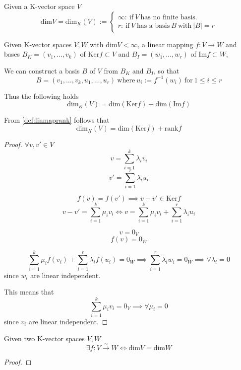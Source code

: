 \begin{definition}[Dimension]
   Given a K-vector space \(V\)
   \[\text{dim}V = \text{dim}_{K}(V) := \begin{cases}\infty:~\text{if}~V~\text{has no finite basis.}\\r:~\text{if}~V~\text{has a basis}~B~\text{with}~|B| = r\end{cases}\]
\end{definition}

\begin{theorem}\label{thm:dim_ker_im}
   Given K-vector spaces  \(V, W\) with \(\text{dim}V < \infty\), a linear mapping \(f: V \to W\) and bases \(B_{K} = (v_1, \ldots, v_k)\) of \(\text{Ker}f \subset V\) and \(B_{I} = (w_1, \ldots, w_r)\) of \(\text{Im}f \subset W\),

   We can construct a basis \(B\) of \(V\) from \(B_{K}\) and \(B_{I}\), so that
   \[B = (v_1, \ldots, v_k, u_1, \ldots, u_r)~\text{where}~u_{i} := f^{-1}(w_i)~\text{for}~1\leq i \leq r\]

   Thus the following holds
   \[\text{dim}_{K}(V) = \text{dim}(\text{Ker}f) + \text{dim}(\text{Im}f)\]
\end{theorem}
\begin{remark}
   From \cref{def:linmaprank} follows that
   \[\text{dim}_{K}(V) = \text{dim}(\text{Ker}f) + \text{rank}f\]
\end{remark}
\begin{proof} %
   \(\forall v, v' \in V\)
   \[v = \sum_{i=1}^k \lambda_i v_i\]
   \[v' = \sum_{i=1}^r \lambda_i u_i\]

   \[f(v) = f(v') \implies v - v' \in \text{Ker}f\]
   \[v - v' = \sum_{i=1}^k \mu_i v_i \iff v = \sum_{i=1}^k \mu_i v_i + \sum_{i=1}^r \lambda_i u_i \]

   \[v = 0_{V}\]
   \[f(v) = 0_{W}\]

   \[\sum_{i=1}^k \mu_i f(v_i) + \sum_{i=1}^r \lambda_i f(u_i) = 0_{W} \implies \sum_{i=1}^r \lambda_i w_i = 0_{W} \implies \forall \lambda_i = 0\]
   since \(w_i\) are linear independent.

   This means that
   \[\sum_{i=1}^k \mu_i v_i = 0_{V} \implies \forall \mu_i = 0\]
   since \(v_i\) are linear independent.
\end{proof}

\begin{corollary}
   Given two K-vector spaces \(V, W\)
   \[\exists f: V \xrightarrow{\sim} W \iff \text{dim}V = \text{dim}W\]
\end{corollary}
\begin{proof}
\end{proof}

